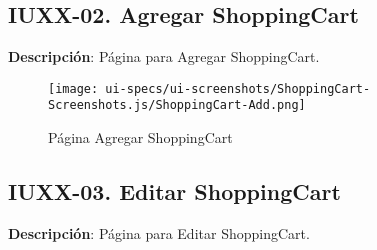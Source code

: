 \clearpage
\subsection{IUXX-02. Agregar ShoppingCart} \label{sec:ui-page-create-shoppingcart}

\textbf{Descripci\'on}: P\'agina para Agregar ShoppingCart.\\

\begin{figure}[H]
	\label{tab:ui-create-shoppingcart-page}
	\texttt{[image: ui-specs/ui-screenshots/ShoppingCart-Screenshots.js/ShoppingCart-Add.png]}
	\caption{P\'agina Agregar ShoppingCart}
\end{figure}

\begin{table}[H]
	\caption{Forma Agregar ShoppingCart}
	\label{tab:ui-create-shoppingcart-form}
\end{table}

\clearpage
\subsection{IUXX-03. Editar ShoppingCart} \label{sec:ui-page-update-shoppingcart}

\textbf{Descripci\'on}: P\'agina para Editar ShoppingCart.\\

